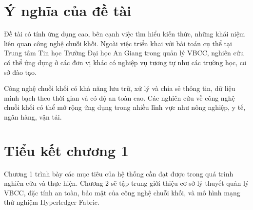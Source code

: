 \section{Ý nghĩa của đề tài}

Đề tài có tính ứng dụng cao, bên cạnh việc tìm hiểu kiến thức, những khái niệm liên quan công nghệ chuỗi khối.
Ngoài việc triển khai với bài toán cụ thể tại Trung tâm Tin học Trường Đại học An Giang trong quản lý VBCC, nghiên cứu có thể ứng dụng ở các đơn vị khác có nghiệp vụ tương tự như các trường học, cơ sở đào tạo.

Công nghệ chuỗi khối có khả năng lưu trữ, xử lý và chia sẻ thông tin, dữ liệu minh bạch theo thời gian và có độ an toàn cao. Các nghiên cứu về công nghệ chuỗi khối có thể mở rộng ứng dụng trong nhiều lĩnh vực như nông nghiệp, y tế, ngân hàng, vận tải.
\section{Tiểu kết chương 1}

Chương 1 trình bày các mục tiêu của hệ thống cần đạt được trong quá trình nghiên cứu và thực hiện. Chương 2 sẽ tập trung giới thiệu cơ sở lý thuyết quản lý VBCC, đặc tính an toàn, bảo mật của công nghệ chuỗi khối, và mô hình mạng thử nghiệm Hyperledger Fabric.
